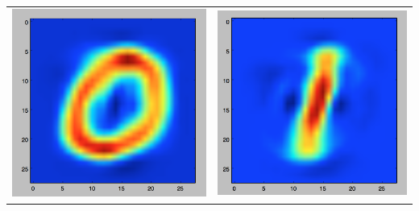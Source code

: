 \documentclass[11pt]{article}
\begin{document}
\begin{table}[!th]
\centering
\begin{tabular}{|c|c|}
\hline
\includegraphics[scale=.15]{images/bayes0.png} & \includegraphics[scale=.15]{images/bayes1.png} \\

\end{tabular}
\end{table}
\end{document}
